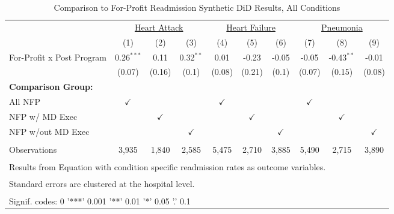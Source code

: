 \begin{table}[ht!]

\caption{\label{tab:fp_read_condition_synth}Comparison to For-Profit Readmission Synthetic DiD Results, All Conditions}
\centering
\begin{tabular}[t]{lccccccccc}
\toprule
\multicolumn{1}{c}{\underline{ }} & \multicolumn{3}{c}{\underline{Heart Attack}} & \multicolumn{3}{c}{\underline{Heart Failure}} & \multicolumn{3}{c}{\underline{Pneumonia}} \\
 & (1) & (2) & (3) & (4) & (5) & (6) & (7) & (8) & (9)\\
\midrule
For-Profit x Post Program & 0.26$^{***}$ & 0.11 & 0.32$^{**}$ & 0.01 & -0.23 & -0.05 & -0.05 & -0.43$^{**}$ & -0.01\\
 & (0.07) & (0.16) & (0.1) & (0.08) & (0.21) & (0.1) & (0.07) & (0.15) & (0.08)\\
\textbf{Comparison Group:} &  &  &  &  &  &  &  &  & \\
All NFP & $\checkmark$ &  &  & $\checkmark$ &  &  & $\checkmark$ &  & \\
NFP w/ MD Exec &  & $\checkmark$ &  &  & $\checkmark$ &  &  & $\checkmark$ & \\
\addlinespace
NFP w/out MD Exec &  &  & $\checkmark$ &  &  & $\checkmark$ &  &  & $\checkmark$\\
 &  &  &  &  &  &  &  &  & \\
Observations & 3,935 & 1,840 & 2,585 & 5,475 & 2,710 & 3,885 & 5,490 & 2,715 & 3,890\\
\bottomrule
\multicolumn{10}{l}{\textsuperscript{} Results from Equation with condition specific readmission rates as outcome variables.}\\
\multicolumn{10}{l}{\textsuperscript{} Standard errors are clustered at the hospital level.}\\
\multicolumn{10}{l}{\textsuperscript{} Signif. codes: 0 '***' 0.001 '**' 0.01 '*' 0.05 '.' 0.1}\\
\end{tabular}
\end{table}
